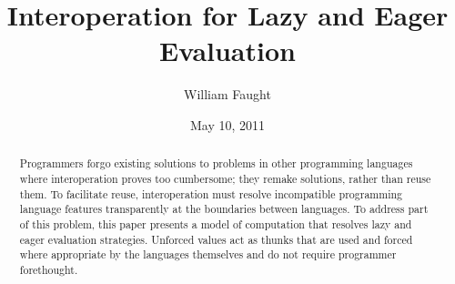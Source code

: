 \documentclass[12pt]{article}
\begin{document}
\title{Interoperation for Lazy and Eager Evaluation}
\author{William Faught}
\date{May 10, 2011}
\maketitle

\begin{abstract}
Programmers forgo existing solutions to problems in other programming languages where interoperation proves too cumbersome; they remake solutions, rather than reuse them. To facilitate reuse, interoperation must resolve incompatible programming language features transparently at the boundaries between languages. To address part of this problem, this paper presents a model of computation that resolves lazy and eager evaluation strategies. Unforced values act as thunks that are used and forced where appropriate by the languages themselves and do not require programmer forethought.
\end{abstract}






\clearpage



\end{document}
